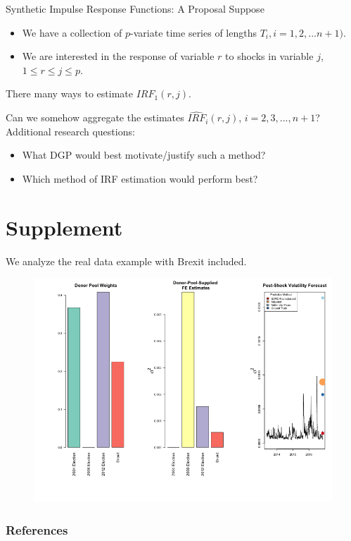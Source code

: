 \documentclass[9pt]{beamer}
\theoremstyle{definition}
\begin{document}
\begin{frame}{Synthetic Impulse Response Functions: A Proposal}
    Suppose 
    \begin{itemize}
        \item We have a collection of $p$-variate time series of lengths $T_{i}, i=1,2,...n+1)$.
        \item We are interested in the response of variable $r$ to shocks in variable $j$, $1\leq r \leq j \leq p$. 

    \end{itemize}
    
\bigbreak
There many ways to estimate $IRF_{1}(r,j).$

\bigbreak
Can we somehow aggregate the estimates $\widehat{IRF}_{i}(r,j)$, $i = 2,3,...,n+1$? \\

Additional research questions:
\begin{itemize}
    \item What DGP would best motivate/justify such a method?
    \item Which method of IRF estimation would perform best?

\end{itemize}
\end{frame}
\section{Supplement}
We analyze the real data example with Brexit included.

\begin{figure}[H]
    \begin{center}
      \includegraphics[scale=.32]{real_data_output_plots/savetime_SunMar172251232024_IYG_6B=F-CL=F-^VIX-^IRX-^FVX-^TNX-^TYX_^VIX_2016-11-08-2004-11-02-2008-11-04-2012-11-06-2016-06-22.png}
      \end{center}
    \end{figure}
    

\begin{frame}[t,allowframebreaks]
    \frametitle{References}

\printbibliography[heading=none]
\end{frame}
\end{document}
